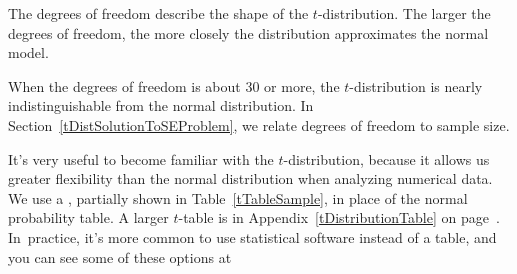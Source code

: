 \begin{termBox}{
The degrees of freedom describe the shape of the $t$-distribution. The larger the degrees of freedom, the more closely the distribution approximates the normal model.}
\end{termBox}

When the degrees of freedom is about 30 or more, the $t$-distribution is nearly indistinguishable from the normal distribution. In Section~\ref{tDistSolutionToSEProblem}, we relate degrees of freedom to sample size.

It's very useful to become familiar with the $t$-distribution, because it allows us greater flexibility than the normal distribution when analyzing numerical data. We use a , partially shown in Table~\ref{tTableSample}, in place of the normal probability table. A larger $t$-table is in Appendix~\ref{tDistributionTable} on page~\pageref{tDistributionTable}. In~practice, it's more common to use statistical software instead of a table, and you can see some of these options at
\begin{center}
\end{center}

